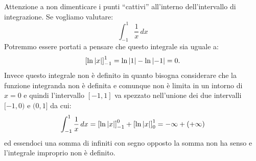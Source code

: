 \begin{remark}
Attenzione a non dimenticare i punti ``cattivi'' all'interno dell'intervallo
di integrazione. Se vogliamo valutare:
\[
  \int_{-1}^1 \frac{1}{x}\, dx
\]
Potremmo essere portati a pensare che questo integrale sia uguale a:
\[
 {\left[ \ln {\left|x\right|} \right]}_{-1}^1 = \ln {\left|1\right|} - \ln {\left|-1\right|} = 0.
\]
Invece questo integrale non è definito in quanto bisogna considerare
che la funzione integranda non è definita e comunque non è limita in un
intorno di $x=0$ e quindi l'intervallo $[-1,1]$ va spezzato nell'unione
dei due intervalli $[-1,0)$ e $(0,1]$ da cui:
\[
  \int_{-1}^1 \frac{1}{x}\, dx = {\left[ \ln {\left|x\right|} \right]}_{-1}^0 + {\left[ \ln{\left|x\right|} \right]}_0^{1}
   = -\infty + (+\infty)
\]
ed essendoci una somma di infiniti con segno opposto la somma non ha senso
e l'integrale improprio non è definito.
\end{remark}

